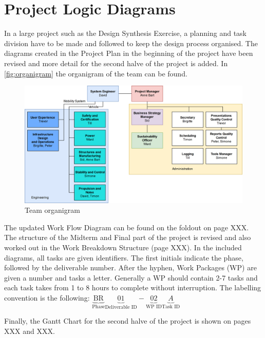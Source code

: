\newpage
\chapter{Project Logic Diagrams}
\label{ch-diagrams}

In a large project such as the Design Synthesis Exercise, a planning and task division have to be made and followed to keep the design process organised. The diagrams created in the Project Plan in the beginning of the project have been revised and more detail for the second halve of the project is added. In \autoref{fig:organigram} the organigram of the team can be found. 



\begin{figure}[h]
    \centering
    \includegraphics[width=0.9\linewidth]{Figures/organigram.png}
    \captionsetup{justification=centering}
    \caption{Team organigram}
    \label{fig:organigram}
\end{figure}



The updated Work Flow Diagram can be found on the foldout on page XXX. The structure of the Midterm and Final part of the project is revised and also worked out in the Work Breakdown Structure (page XXX). In the included diagrams, all tasks are given identifiers. The first initials indicate the phase, followed by the deliverable number. After the hyphen, Work Packages (WP) are given a number and tasks a letter. Generally a WP should contain 2-7 tasks and each task takes from 1 to 8 hours to complete without interruption. The labelling convention is the following: $\underbrace{\text{BR}}_\text{Phase}\underbrace{01}_\text{Deliverable ID}-\underbrace{02}_\text{WP ID}\underbrace{A}_\text{Task ID}$ 

Finally, the Gantt Chart for the second halve of the project is shown on pages XXX and XXX.





